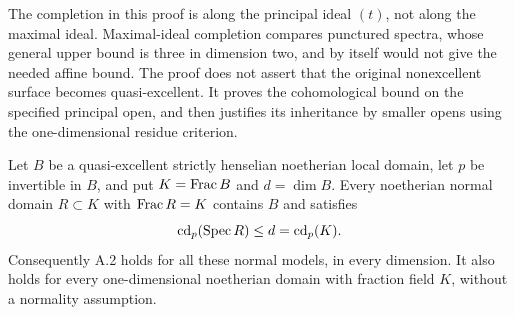 \begin{remark}
The completion in this proof is along the principal ideal $(t)$,
not along the maximal ideal. Maximal-ideal completion compares
punctured spectra, whose general upper bound is three in dimension
two, and by itself would not give the needed affine bound.
The proof does not assert that the original nonexcellent surface
becomes quasi-excellent. It proves the cohomological bound on the
specified principal open, and then justifies its inheritance by
smaller opens using the one-dimensional residue criterion.
\end{remark}

\begin{proposition}
\label{A:strict-model-rigidity}
Let $B$ be a quasi-excellent strictly henselian noetherian local
domain, let $p$ be invertible in $B$, and put $K=\operatorname{Frac} B$ and
$d=\dim B$. Every noetherian normal domain $R\subset K$ with
$\operatorname{Frac} R=K$ contains $B$ and satisfies
\[
 \operatorname{cd}_p(\operatorname{Spec} R)\leq d=\operatorname{cd}_p(K).
\]
Consequently A.2 holds for all these normal models, in every
dimension. It also holds for every one-dimensional noetherian
domain with fraction field $K$, without a normality assumption.
\end{proposition}
